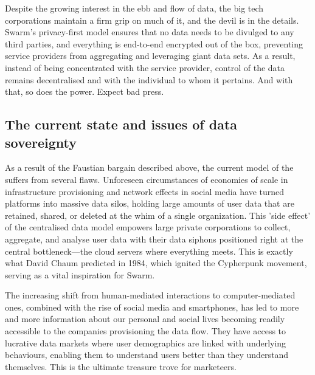 Despite the growing interest in the ebb and flow of data, the big tech corporations maintain a firm grip on much of it, and the devil is in the details. Swarm's privacy-first model ensures that no data needs to be divulged to any third parties, and everything is end-to-end encrypted out of the box, preventing service providers from aggregating and leveraging giant data sets. As a result, instead of being concentrated with the service provider, control of the data remains decentralised and with the individual to whom it pertains. And with that, so does the power. Expect bad press.

\subsection{The current state and issues of data sovereignty \statusgreen }\label{sec:data-sovereignty}

As a result of the Faustian bargain described above, the current model of the  suffers from several flaws. Unforeseen circumstances of economies of scale in infrastructure provisioning and network effects in social media have turned platforms into massive data silos, holding large amounts of user data that are retained, shared, or deleted at the whim of a single organization. This 'side effect' of the centralised data model empowers large private corporations to collect, aggregate, and analyse user data with their data siphons positioned right at the central bottleneck—the cloud servers where everything meets. This is exactly what David Chaum predicted in 1984, which ignited the Cypherpunk movement, serving as a vital inspiration for Swarm.

The increasing shift from human-mediated interactions to computer-mediated ones, combined with the rise of social media and smartphones, has led to more and more information about our personal and social lives becoming readily accessible to the companies provisioning the data flow. They have access to lucrative data markets where user demographics are linked with underlying behaviours, enabling them to understand users better than they understand themselves. This is the ultimate treasure trove for marketeers.

